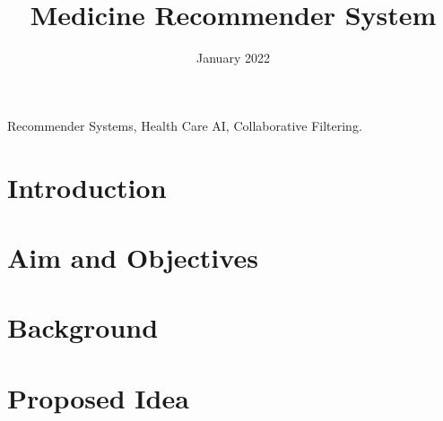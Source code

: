 \documentclass[conference]{IEEEtran}
\begin{document}
\title{Medicine Recommender System}

\author{
	\date{January 2022}
}

\maketitle

\begin{abstract}
    
\end{abstract}

\begin{IEEEkeywords}
    Recommender Systems, Health Care AI, Collaborative Filtering.
\end{IEEEkeywords}

\section{Introduction}
    

\section{Aim and Objectives}
    

\section{Background}
    

\section{Proposed Idea}
    



\end{document}
